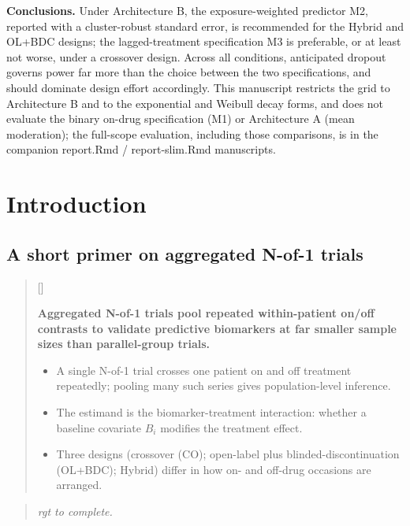 \documentclass[
  11pt,
]{article}
\newcounter{pgraph}
\newenvironment{bullets}{%
  \stepcounter{pgraph}%
  \begin{quote}\small\sffamily\color[gray]{0.30}%
  {\normalfont\scriptsize\color[gray]{0.58}[\thepgraph]\enspace}}{%
  \end{quote}}
\newenvironment{rgt}{%
  \begin{quote}\small\itshape\color[RGB]{20,60,160}}{%
  \end{quote}}
\begin{document}
\textbf{Conclusions.} Under Architecture B, the exposure-weighted
predictor M2, reported with a cluster-robust standard error, is
recommended for the Hybrid and OL+BDC designs; the lagged-treatment
specification M3 is preferable, or at least not worse, under a
crossover design. Across all conditions, anticipated dropout governs
power far more than the choice between the two specifications, and
should dominate design effort accordingly. This manuscript restricts
the grid to Architecture B and to the exponential and Weibull decay
forms, and does not evaluate the binary on-drug specification (M1)
or Architecture A (mean moderation); the full-scope evaluation,
including those comparisons, is in the companion report.Rmd /
report-slim.Rmd manuscripts.

\section{Introduction}\label{introduction}

\subsection{A short primer on aggregated N-of-1 trials}\label{a-short-primer-on-aggregated-n-of-1-trials}

\begin{bullets}

\textbf{Aggregated N-of-1 trials pool repeated within-patient on/off
contrasts to validate predictive biomarkers at far smaller sample
sizes than parallel-group trials.}

\begin{itemize}\setlength{\itemsep}{2pt}\setlength{\parskip}{0pt}
\item A single N-of-1 trial crosses one patient on and off treatment
repeatedly; pooling many such series gives population-level
inference.
\item The estimand is the biomarker-treatment interaction: whether a
baseline covariate $B_i$ modifies the treatment effect.
\item Three designs (crossover (CO); open-label plus
blinded-discontinuation (OL+BDC); Hybrid) differ in how on- and
off-drug occasions are arranged.
\end{itemize}

\end{bullets}

\begin{rgt}
rgt to complete.

\end{rgt}
\end{document}
